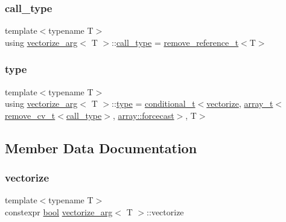 \subsubsection{\texorpdfstring{call\_type}{call\_type}}
{\footnotesize\ttfamily template$<$typename T$>$ \\
using \mbox{\hyperlink{structvectorize__arg}{vectorize\+\_\+arg}}$<$ T $>$\+::\mbox{\hyperlink{structvectorize__arg_a465d48643eac1a5fb514819ceaf8eb1c}{call\+\_\+type}} =  \mbox{\hyperlink{detail_2common_8h_a3a08cea569e6926ac8d7d74dd7178b5f}{remove\+\_\+reference\+\_\+t}}$<$T$>$}

\mbox{\label{structvectorize__arg_a1eac44d967c2119c39a13843b8546c9d}} 
\subsubsection{\texorpdfstring{type}{type}}
{\footnotesize\ttfamily template$<$typename T$>$ \\
using \mbox{\hyperlink{structvectorize__arg}{vectorize\+\_\+arg}}$<$ T $>$\+::\mbox{\hyperlink{structvectorize__arg_a1eac44d967c2119c39a13843b8546c9d}{type}} =  \mbox{\hyperlink{detail_2common_8h_acdb0eff728aec08ed6fff07d2885ea9d}{conditional\+\_\+t}}$<$\mbox{\hyperlink{structvectorize__arg_a2713dcb369c1ff6d3ec66f9b91419735}{vectorize}}, \mbox{\hyperlink{classarray__t}{array\+\_\+t}}$<$\mbox{\hyperlink{detail_2common_8h_a92dc8767e0b0b9b6022f61cb5b52278f}{remove\+\_\+cv\+\_\+t}}$<$\mbox{\hyperlink{structvectorize__arg_a465d48643eac1a5fb514819ceaf8eb1c}{call\+\_\+type}}$>$, \mbox{\hyperlink{classarray_af40deff69606a75cf645863432967ba7a2886e477a3f6090266168e82d389adc1}{array\+::forcecast}}$>$, T$>$}



\subsection{Member Data Documentation}
\mbox{\label{structvectorize__arg_a2713dcb369c1ff6d3ec66f9b91419735}} 
\subsubsection{\texorpdfstring{vectorize}{vectorize}}
{\footnotesize\ttfamily template$<$typename T$>$ \\
constexpr \mbox{\hyperlink{asdl_8h_af6a258d8f3ee5206d682d799316314b1}{bool}} \mbox{\hyperlink{structvectorize__arg}{vectorize\+\_\+arg}}$<$ T $>$\+::vectorize\hspace{0.3cm}{\ttfamily [static]}}

